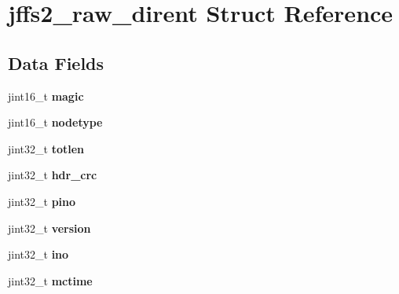 \hypertarget{structjffs2__raw__dirent}{}\section{jffs2\+\_\+raw\+\_\+dirent Struct Reference}
\label{structjffs2__raw__dirent}
\subsection*{Data Fields}
\begin{DoxyCompactItemize}
\item 
\mbox{\label{structjffs2__raw__dirent_aa45c3c78a922f844f09e6fac84fcc554}} 
jint16\+\_\+t {\bfseries magic}
\item 
\mbox{\label{structjffs2__raw__dirent_a0a262ab19e10f5f9469ed7089c421479}} 
jint16\+\_\+t {\bfseries nodetype}
\item 
\mbox{\label{structjffs2__raw__dirent_a45217a69704f8aef5917e88d9f82dcf5}} 
jint32\+\_\+t {\bfseries totlen}
\item 
\mbox{\label{structjffs2__raw__dirent_aaea168fb8e0b2628218cceb5d38a75da}} 
jint32\+\_\+t {\bfseries hdr\+\_\+crc}
\item 
\mbox{\label{structjffs2__raw__dirent_a25146d42c62e6051652766b507bfce08}} 
jint32\+\_\+t {\bfseries pino}
\item 
\mbox{\label{structjffs2__raw__dirent_acec877f996d81c2fe898f75422d24d21}} 
jint32\+\_\+t {\bfseries version}
\item 
\mbox{\label{structjffs2__raw__dirent_ac2d4b06dbd63230fdb0373455288b67c}} 
jint32\+\_\+t {\bfseries ino}
\item 
\mbox{\label{structjffs2__raw__dirent_aa43c018f6444cddb9c40ae2db05e50ea}} 
jint32\+\_\+t {\bfseries mctime}
\item 
\mbox{\label{structjffs2__raw__dirent_a4b891637ca3b46c6e1c0f8ad6f620981}} 

\end{DoxyCompactItemize}
